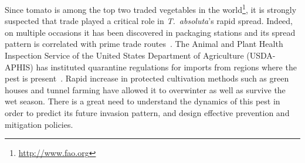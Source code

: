 \documentclass[11pt]{article}
\newcommand{\tuta}{\emph{T.~absoluta}}
\theoremstyle{definition}
\begin{document}
Since tomato is among the top two traded vegetables in the
world\footnote{\url{http://www.fao.org}}, it is strongly suspected that
trade played a critical role in \tuta{}'s rapid spread. Indeed, on multiple
occasions it has been discovered in packaging stations and its spread
pattern is correlated with prime trade routes~\cite{karadjova2013tuta}.
The Animal and Plant Health Inspection Service of the United States
Department of Agriculture (USDA-APHIS) has instituted quarantine
regulations for imports from regions where the pest is
present~\cite{USDA2012}. Rapid increase in protected cultivation methods
such as green houses and tunnel farming have allowed it to overwinter as
well as survive the wet season. There is a great need to understand the
dynamics of this pest in order to predict its future invasion pattern, and
design effective prevention and mitigation policies.

\end{document}
